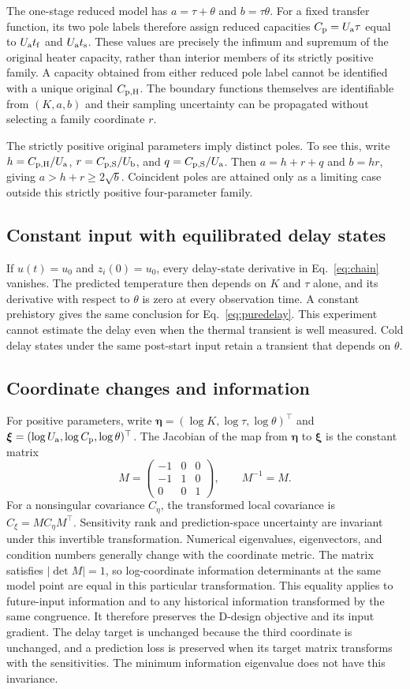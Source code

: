 The one-stage reduced model has $a=\tau+\theta$ and $b=\tau\theta$.
For a fixed transfer function, its two pole labels therefore assign reduced
capacities $C_{\mathrm p}=U_{\mathrm a}\tau$ equal to $U_{\mathrm a} t_{\mathrm f}$ and
$U_{\mathrm a} t_{\mathrm s}$. These values are precisely the infimum and supremum of
the original heater capacity, rather than interior members of its strictly
positive family. A capacity obtained from either reduced pole label cannot
be identified with a unique original $C_{\mathrm{p,H}}$. The boundary functions themselves
are identifiable from $(K,a,b)$ and their sampling uncertainty can be propagated
without selecting a family coordinate $r$.

The strictly positive original parameters imply distinct poles. To see this,
write $h=C_{\mathrm{p,H}}/U_{\mathrm a}$, $r=C_{\mathrm{p,S}}/U_{\mathrm b}$, and $q=C_{\mathrm{p,S}}/U_{\mathrm a}$. Then $a=h+r+q$
and $b=hr$, giving $a>h+r\geq2\sqrt b$. Coincident poles are attained only
as a limiting case outside this strictly positive four-parameter family.

\subsection{Constant input with equilibrated delay states}
If $u(t)=u_0$ and $z_i(0)=u_0$, every delay-state derivative in
Eq.~\eqref{eq:chain} vanishes. The predicted temperature then depends on
$K$ and $\tau$ alone, and its derivative with respect to $\theta$ is zero at
every observation time. A constant prehistory gives the same conclusion for
Eq.~\eqref{eq:puredelay}. This experiment cannot estimate the delay even when
the thermal transient is well measured. Cold delay states under the same
post-start input retain a transient that depends on $\theta$.

\subsection{Coordinate changes and information}
For positive parameters, write $\bm\eta=(\log K,\log\tau,\log\theta)^\top$
and $\bm\xi=(\log U_{\mathrm a},\log C_{\mathrm p},\log\theta)^\top$. The Jacobian of the map
from $\bm\eta$ to $\bm\xi$ is the constant matrix
\[
 M=\begin{pmatrix}-1&0&0\\-1&1&0\\0&0&1\end{pmatrix},\qquad M^{-1}=M.
\]
For a nonsingular covariance $C_{\eta}$, the transformed local covariance is
$C_{\xi}=M C_{\eta}M^\top$. Sensitivity rank and prediction-space uncertainty
are invariant under this invertible transformation. Numerical eigenvalues,
eigenvectors, and condition numbers generally change with the coordinate metric.
The matrix satisfies $|\det M|=1$, so log-coordinate information determinants
at the same model point are equal in this particular transformation.
This equality applies to future-input information and to any historical
information transformed by the same congruence. It therefore preserves the
D-design objective and its input gradient. The delay target is unchanged
because the third coordinate is unchanged, and a prediction loss is preserved
when its target matrix transforms with the sensitivities. The minimum
information eigenvalue does not have this invariance.

